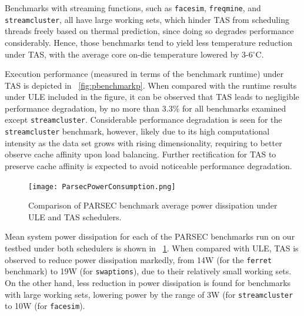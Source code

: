 \documentclass[times, 10pt,twocolumn]{IEEEtran}
\begin{document}
Benchmarks with streaming functions, such as \texttt{facesim},
\texttt{freqmine}, and \texttt{streamcluster}, all have large working
sets, which hinder TAS from scheduling threads freely based on thermal
prediction, since doing so degrades performance considerably.  Hence,
those benchmarks tend to yield less temperature reduction under TAS,
with the average core on-die temperature lowered by 3-6$^{\circ}$C.  

Execution performance (measured in terms of the benchmark runtime) under
TAS is depicted in \figurename~\ref{fig:pbenchmarkp}.  When compared
with the runtime results under ULE included in the figure, it can be
observed that TAS leads to negligible performance degradation, by no
more than 3.3\% for all benchmarks examined except
\texttt{streamcluster}.  Considerable performance degradation is seen
for the \texttt{streamcluster} benchmark, however, likely due to its high
computational intensity as the data set grows with rising dimensionality,
requiring to better observe cache affinity upon load balancing.
Further rectification for TAS to preserve cache affinity is expected
to avoid noticeable performance degradation.

\begin{figure}[tbp]
  \texttt{[image: ParsecPowerConsumption.png]}
  \caption{Comparison of PARSEC benchmark average power dissipation under ULE and TAS schedulers.}
  \label{fig:pbenchmark}
\end{figure}
Mean system power dissipation for each of the PARSEC benchmarks run on
our testbed under both schedulers is shown in
\figurename~\ref{fig:pbenchmark}.  When compared with ULE, TAS is
observed to reduce power dissipation markedly, from 14W (for the 
\texttt{ferret} benchmark) to 19W (for \texttt{swaptions}), due to their
relatively small working sets.  On the other hand, less reduction in
power dissipation is found for benchmarks with large working sets,
lowering power by the range of 3W (for \texttt{streamcluster} to 10W
(for \texttt{facesim}).
\end{document}
